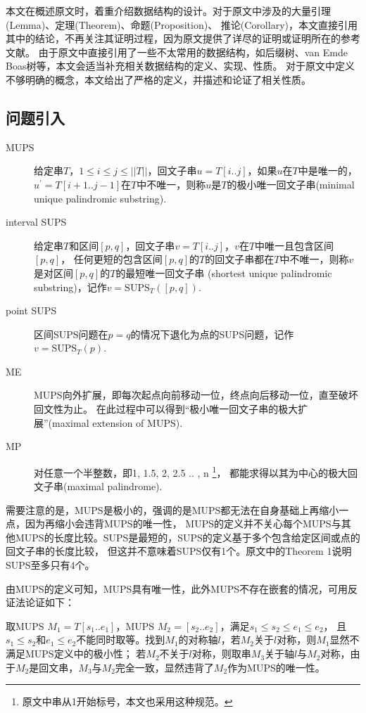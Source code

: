 
本文在概述原文时，着重介绍数据结构的设计。对于原文中涉及的大量引理(Lemma)、定理(Theorem)、命题(Proposition)、
推论(Corollary)，本文直接引用其中的结论，不再关注其证明过程，因为原文提供了详尽的证明或证明所在的参考文献。
由于原文中直接引用了一些不太常用的数据结构，如后缀树、van Emde Boas树等，本文会适当补充相关数据结构的定义、实现、性质。
对于原文中定义不够明确的概念，本文给出了严格的定义，并描述和论证了相关性质。

\subsection{问题引入}\label{subsec:intro}

\begin{description}
    \item [MUPS] 给定串$T$，$1 \leq i \leq j \leq ||T||$，回文子串$u = T[i..j]$，如果$u$在$T$中是唯一的，
    $u^{\prime} = T[i + 1..j - 1]$在$T$中不唯一，则称$u$是$T$的极小唯一回文子串(minimal unique palindromic substring).
    \item [interval SUPS] 给定串$T$和区间$[p,q]$，回文子串$v = T[i..j]$，$v$在$T$中唯一且包含区间$[p,q]$，
    任何更短的包含区间$[p,q]$的$T$的回文子串都在$T$中不唯一，则称$v$是对区间$[p,q]$的$T$的最短唯一回文子串
    (shortest unique palindromic substring)，记作$v = \mathrm{SUPS}_T ([p,q])$.
    \item[point SUPS] 区间SUPS问题在$p = q$的情况下退化为点的SUPS问题，记作$v = \mathrm{SUPS}_T (p)$.
    \item[ME] MUPS向外扩展，即每次起点向前移动一位，终点向后移动一位，直至破坏回文性为止。
    在此过程中可以得到“极小唯一回文子串的极大扩展”(maximal extension of MUPS).
    \item[MP] 对任意一个半整数，即1, 1.5, 2, 2.5 .. , n \footnote{原文中串从1开始标号，本文也采用这种规范。}，
    都能求得以其为中心的极大回文子串(maximal palindrome).
\end{description}

需要注意的是，MUPS是极小的，强调的是MUPS都无法在自身基础上再缩小一点，因为再缩小会违背MUPS的唯一性，
MUPS的定义并不关心每个MUPS与其他MUPS的长度比较。SUPS是最短的，SUPS的定义基于多个包含给定区间或点的回文子串的长度比较，
但这并不意味着SUPS仅有1个。原文中的Theorem 1说明SUPS至多只有4个。

由MUPS的定义可知，MUPS具有唯一性，此外MUPS不存在嵌套的情况，可用反证法论证如下：

取MUPS $M_1 = T[s_1..e_1]$，MUPS $M_2 = [s_2..e_2]$，满足$s_1 \leq s_2 \leq e_1 \leq e_2 $，
且$s_1 \leq s_2$和$e_1 \leq e_2$不能同时取等。找到$M_1$的对称轴$l$，若$M_2$关于$l$对称，则$M_1$显然不满足MUPS定义中的极小性；
若$M_2$不关于$l$对称，则取串$M_3$关于轴$l$与$M_2$对称，由于$M_2$是回文串，$M_3$与$M_2$完全一致，显然违背了$M_2$作为MUPS的唯一性。

